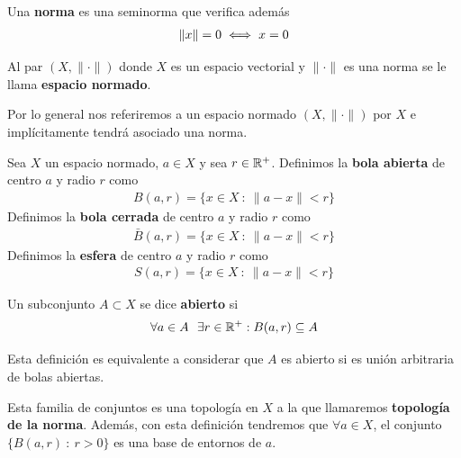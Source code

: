 \begin{definicion}
    Una \textbf{norma} es una seminorma que verifica además
    \begin{gather*}
        \|x\| = 0 \iff x=0
    \end{gather*}
\end{definicion}

\begin{definicion}
    Al par $(X, \|\cdot\|)$ donde $X$ es un espacio vectorial y $\|\cdot\|$ es una norma se le llama \textbf{espacio normado}.
\end{definicion}

\begin{notacion}
    Por lo general nos referiremos a un espacio normado $(X, \|\cdot\|)$ por $X$ e implícitamente tendrá asociado una norma.
\end{notacion}

\begin{definicion}
    Sea $X$ un espacio normado, $a\in X$ y sea $r\in \mathbb{R}^+$. Definimos la \textbf{bola abierta} de centro $a$ y radio $r$ como 
    \begin{gather*}
        B(a,r) = \{x\in X \ : \ \|a-x\| < r\}
    \end{gather*}
    Definimos la \textbf{bola cerrada} de centro $a$ y radio $r$ como 
    \begin{gather*}
        \bar{B}(a,r)= \{x\in X \ : \ \|a-x\| < r\}
    \end{gather*}
    Definimos la \textbf{esfera} de centro $a$ y radio $r$ como 
    \begin{gather*}
        S(a,r) = \{x\in X \ : \ \|a-x\| < r\}
    \end{gather*}
\end{definicion}

\begin{definicion}
    Un subconjunto $A\subset X$ se dice \textbf{abierto} si 
    \begin{gather*}
        \forall a \in A \ \ \exists r \in \mathbb{R}^+ : B(a,r)\subseteq A
    \end{gather*}
\end{definicion}

\begin{observacion}
    Esta definición es equivalente a considerar que $A$ es abierto si es unión arbitraria de bolas abiertas.
\end{observacion}

\begin{definicion}
    Esta familia de conjuntos es una topología en $X$ a la que llamaremos \textbf{topología de la norma}. Además, con esta definición tendremos que $\forall a \in X$, el conjunto $\{B(a,r) \ : \ r>0\}$ es una base de entornos de $a$.
\end{definicion}

